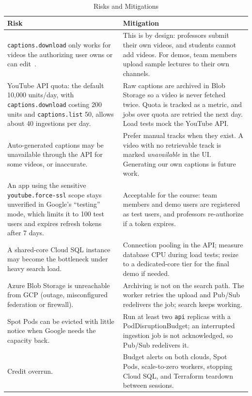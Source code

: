 \documentclass[conference]{IEEEtran}
\begin{document}
\begin{table}[!t]
\caption{Risks and Mitigations}
\label{tab:risks}
\centering
\footnotesize
\begin{tabularx}{\columnwidth}{@{}YY@{}}
\toprule
\textbf{Risk} & \textbf{Mitigation} \\
\midrule
\texttt{captions.download} only works for videos the authorizing user owns or can edit~\cite{yt-captions}. & This is by design: professors submit their own videos, and students cannot add videos. For demos, team members upload sample lectures to their own channels. \\
YouTube API quota: the default 10,000 units/day, with \texttt{captions.download} costing 200 units and \texttt{captions.list} 50, allows about 40 ingestions per day. & Raw captions are archived in Blob Storage so a video is never fetched twice. Quota is tracked as a metric, and jobs over quota are retried the next day. Load tests mock the YouTube API. \\
Auto-generated captions may be unavailable through the API for some videos, or inaccurate. & Prefer manual tracks when they exist. A video with no retrievable track is marked \emph{unavailable} in the UI. Generating our own captions is future work. \\
An app using the sensitive \texttt{youtube.force-ssl} scope stays unverified in Google's ``testing'' mode, which limits it to 100 test users and expires refresh tokens after 7 days. & Acceptable for the course: team members and demo users are registered as test users, and professors re-authorize if a token expires. \\
A shared-core Cloud SQL instance may become the bottleneck under heavy search load. & Connection pooling in the API; measure database CPU during load tests; resize to a dedicated-core tier for the final demo if needed. \\
Azure Blob Storage is unreachable from GCP (outage, misconfigured federation or firewall). & Archiving is not on the search path. The worker retries the upload and Pub/Sub redelivers the job; search keeps working. \\
Spot Pods can be evicted with little notice when Google needs the capacity back. & Run at least two \texttt{api} replicas with a PodDisruptionBudget; an interrupted ingestion job is not acknowledged, so Pub/Sub redelivers it. \\
Credit overrun. & Budget alerts on both clouds, Spot Pods, scale-to-zero workers, stopping Cloud SQL, and Terraform teardown between sessions. \\
\bottomrule
\end{tabularx}
\end{table}
\end{document}
